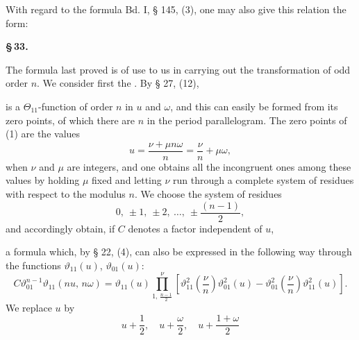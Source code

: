 With regard to the formula Bd. I, § 145, (3), one may also give this relation the form:


\begin{center}
\textbf{\S\,33. }
\end{center}

The formula last proved is of use to us in carrying out the transformation of odd order $n$. We consider first the . By § 27, (12),


is a $\Theta_{11}$-function of order $n$ in $u$ and $\omega$, and this can easily be formed from its zero points, of which there are $n$ in the period parallelogram. The zero points of (1) are the values
\[
u = \frac{\nu + \mu n\omega}{n} = \frac{\nu}{n} + \mu\omega,
\]
when $\nu$ and $\mu$ are integers, and one obtains all the incongruent ones among these values by holding $\mu$ fixed and letting $\nu$ run through a complete system of residues with respect to the modulus $n$. We choose the system of residues
\[
0,\ \pm 1,\ \pm 2,\ \ldots,\ \pm\frac{(n-1)}{2},
\]
and accordingly obtain, if $C$ denotes a factor independent of $u$,


a formula which, by § 22, (4), can also be expressed in the following way through the functions $\vartheta_{11}(u)$, $\vartheta_{01}(u)$:
\[
C\vartheta_{01}^{n-1}\vartheta_{11}(nu,\,n\omega) = \vartheta_{11}(u) \prod_{1,\,\frac{n-1}{2}}^{\nu} \left[\vartheta_{11}^2\left(\frac{\nu}{n}\right)\vartheta_{01}^2(u) - \vartheta_{01}^2\left(\frac{\nu}{n}\right)\vartheta_{11}^2(u)\right].
\]
We replace $u$ by
\[
u + \frac{1}{2}, \quad u + \frac{\omega}{2}, \quad u + \frac{1+\omega}{2}
\]
